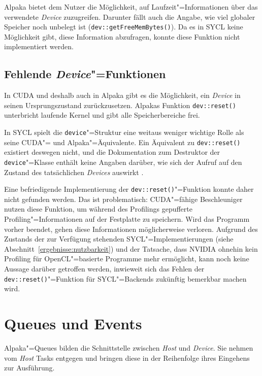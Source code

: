 Alpaka bietet dem Nutzer die Möglichkeit, auf Laufzeit"=Informationen über das
verwendete \textit{Device} zuzugreifen. Darunter fällt auch die Angabe, wie viel
globaler Speicher noch unbelegt ist (\texttt{dev::getFreeMemBytes()}). Da es in
SYCL keine Möglichkeit gibt, diese Information abzufragen, konnte diese Funktion
nicht implementiert werden.

\subsection{Fehlende \textit{Device}"=Funktionen}

In CUDA und deshalb auch in Alpaka gibt es die Möglichkeit, ein \textit{Device}
in seinen Ursprungszustand zurückzusetzen. Alpakas Funktion
\texttt{dev::reset()} unterbricht laufende Kernel und gibt alle Speicherbereiche
frei. 

In SYCL spielt die \texttt{device}"=Struktur eine weitaus weniger wichtige
Rolle als seine CUDA"= und Alpaka"=Äquivalente. Ein Äquivalent zu
\texttt{dev::reset()} existiert deswegen nicht, und die Dokumentation zum
Destruktor der \texttt{device}"=Klasse enthält keine Angaben darüber, wie sich
der Aufruf auf den Zustand des tatsächlichen \textit{Devices} auswirkt
\cite[vgl.][33,41,58]{sycl2019}.

Eine befriedigende Implementierung der \texttt{dev::reset()}"=Funktion konnte
daher nicht gefunden werden. Das ist problematisch: CUDA"=fähige Beschleuniger
nutzen diese Funktion, um während des Profilings gepufferte
Profiling"=Informationen auf der Festplatte zu speichern. Wird das Programm
vorher beendet, gehen diese Informationen möglicherweise verloren. Aufgrund des
Zustands der zur Verfügung stehenden SYCL"=Implementierungen (siehe
Abschnitt~\ref{ergebnisse:nutzbarkeit}) und der Tatsache, dass NVIDIA ohnehin
kein Profiling für OpenCL"=basierte Programme mehr ermöglicht, kann noch keine
Aussage darüber getroffen werden, inwieweit sich das Fehlen der
\texttt{dev::reset()}"=Funktion für SYCL"=Backends zukünftig bemerkbar machen
wird.

\section{Queues und Events}
\label{implementierung:queue}

Alpaka"=Queues bilden die Schnittstelle zwischen \textit{Host} und
\textit{Device}. Sie nehmen vom \textit{Host} Tasks entgegen und bringen diese
in der Reihenfolge ihres Eingehens zur Ausführung.


